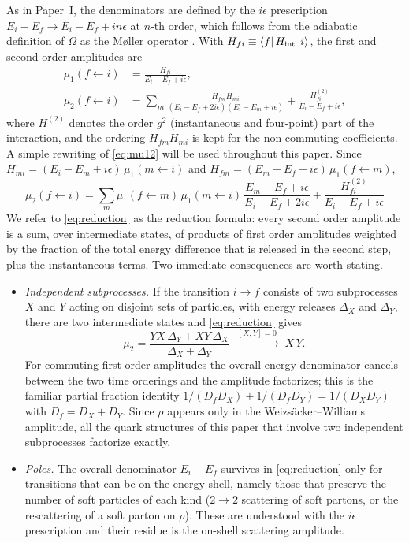 \documentclass[11pt,a4paper]{article}
\numberwithin{equation}{section}
\newcommand{\ket}[1]{\left|#1\right\rangle}
\newcommand{\bra}[1]{\left\langle#1\right|}
\newcommand{\OM}{\Omega}
\begin{document}
As in Paper~I, the denominators are defined by the $i\epsilon$ prescription
$E_{i}-E_{f}\to E_{i}-E_{f}+in\epsilon$ at $n$-th order, which follows from the adiabatic definition of
$\OM$ as the M{\o}ller operator \cite{Munier:2025unitary,Kovner:2018fxj}. With
$H_{fi}\equiv\bra{f}H_{\rm int}\ket{i}$, the first and second order amplitudes are
\begin{align}
\mu_{1}(f\leftarrow i)&=\frac{H_{fi}}{E_{i}-E_{f}+i\epsilon},
\nonumber\\
\mu_{2}(f\leftarrow i)&=\sum_{m}\frac{H_{fm}H_{mi}}{(E_{i}-E_{f}+2i\epsilon)(E_{i}-E_{m}+i\epsilon)}
+\frac{H^{(2)}_{fi}}{E_{i}-E_{f}+i\epsilon},
\label{eq:mu12}
\end{align}
where $H^{(2)}$ denotes the order $g^{2}$ (instantaneous and four-point) part of the
interaction, and the ordering $H_{fm}H_{mi}$ is kept for the non-commuting coefficients. A
simple rewriting of \eqref{eq:mu12} will be used throughout this paper. Since
$H_{mi}=(E_{i}-E_{m}+i\epsilon)\,\mu_{1}(m\leftarrow i)$ and
$H_{fm}=(E_{m}-E_{f}+i\epsilon)\,\mu_{1}(f\leftarrow m)$,
\begin{equation}
\boxed{\;
\mu_{2}(f\leftarrow i)=\sum_{m}\mu_{1}(f\leftarrow m)\,\mu_{1}(m\leftarrow i)\,
\frac{E_{m}-E_{f}+i\epsilon}{E_{i}-E_{f}+2i\epsilon}
+\frac{H^{(2)}_{fi}}{E_{i}-E_{f}+i\epsilon}\;}
\label{eq:reduction}
\end{equation}
We refer to \eqref{eq:reduction} as the reduction formula: every second order amplitude is a sum,
over intermediate states, of products of first order amplitudes weighted by the fraction of the
total energy difference that is released in the second step, plus the instantaneous terms.
Two immediate consequences are worth stating.
\begin{itemize}
\item[(i)] \emph{Independent subprocesses.} If the transition $i\to f$ consists of two subprocesses
$X$ and $Y$ acting on disjoint sets of particles, with energy releases $\Delta_{X}$ and $\Delta_{Y}$,
there are two intermediate states and \eqref{eq:reduction} gives
\begin{equation}
\mu_{2}=\frac{Y X\,\Delta_{Y}+X Y\,\Delta_{X}}{\Delta_{X}+\Delta_{Y}}
\;\xrightarrow{\;[X,Y]=0\;}\;X\,Y .
\label{eq:factor}
\end{equation}
For commuting first order amplitudes the overall energy denominator cancels between the two
time orderings and the amplitude factorizes; this is the familiar partial fraction identity
$1/(D_{f}D_{X})+1/(D_{f}D_{Y})=1/(D_{X}D_{Y})$ with $D_{f}=D_{X}+D_{Y}$. Since $\rho$ appears
only in the Weizs\"acker--Williams amplitude, all the quark structures of this paper that involve
two independent subprocesses factorize exactly.
\item[(ii)] \emph{Poles.} The overall denominator $E_{i}-E_{f}$ survives in \eqref{eq:reduction} only
for transitions that can be on the energy shell, namely those that preserve the number of soft
particles of each kind ($2\to2$ scattering of soft partons, or the rescattering of a soft parton
on $\rho$). These are understood with the $i\epsilon$ prescription and their residue is the
on-shell scattering amplitude.
\end{itemize}
\end{document}
